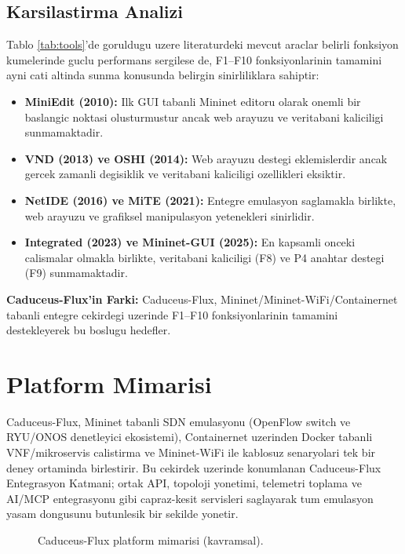 \documentclass[conference]{IEEEtran}
\begin{document}
\subsection{Karsilastirma Analizi}
Tablo \ref{tab:tools}'de goruldugu uzere literaturdeki mevcut araclar belirli fonksiyon kumelerinde guclu performans sergilese de, F1--F10 fonksiyonlarinin tamamini ayni cati altinda sunma konusunda belirgin sinirliliklara sahiptir:
\begin{itemize}
\item \textbf{MiniEdit (2010):} Ilk GUI tabanli Mininet editoru olarak onemli bir baslangic noktasi olusturmustur ancak web arayuzu ve veritabani kaliciligi sunmamaktadir.
\item \textbf{VND (2013) ve OSHI (2014):} Web arayuzu destegi eklemislerdir ancak gercek zamanli degisiklik ve veritabani kaliciligi ozellikleri eksiktir.
\item \textbf{NetIDE (2016) ve MiTE (2021):} Entegre emulasyon saglamakla birlikte, web arayuzu ve grafiksel manipulasyon yetenekleri sinirlidir.
\item \textbf{Integrated (2023) ve Mininet-GUI (2025):} En kapsamli onceki calismalar olmakla birlikte, veritabani kaliciligi (F8) ve P4 anahtar destegi (F9) sunmamaktadir.
\end{itemize}

\textbf{Caduceus-Flux'in Farki:} Caduceus-Flux, Mininet/Mininet-WiFi/Containernet tabanli entegre cekirdegi uzerinde F1--F10 fonksiyonlarinin tamamini destekleyerek bu boslugu hedefler.

\section{Platform Mimarisi}
Caduceus-Flux, Mininet tabanli SDN emulasyonu (OpenFlow switch ve RYU/ONOS denetleyici ekosistemi), Containernet uzerinden Docker tabanli VNF/mikroservis calistirma ve Mininet-WiFi ile kablosuz senaryolari tek bir deney ortaminda birlestirir. Bu cekirdek uzerinde konumlanan Caduceus-Flux Entegrasyon Katmani; ortak API, topoloji yonetimi, telemetri toplama ve AI/MCP entegrasyonu gibi capraz-kesit servisleri saglayarak tum emulasyon yasam dongusunu butunlesik bir sekilde yonetir.

\begin{figure}[htbp]
\centering
{}
\caption{Caduceus-Flux platform mimarisi (kavramsal).}
\label{fig:platform_arch}
\end{figure}
\end{document}

